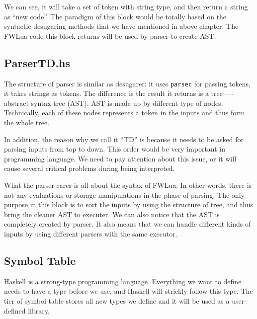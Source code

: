 \documentclass{article}
\begin{document}
We can see, it will take a set of token with string type, and then return a string as ``new code''. The paradigm of this block would be totally based on the syntactic desugaring methods that we have mentioned in above chapter. The FWLua code this block returns will be used by parser to create AST.

\subsection{ParserTD.hs}
The structure of parser is similar as desugarer: it uses {\tt parsec} for passing tokens, it takes strings as tokens. The difference is the result it returns is a tree ---- abstract syntax tree (AST).
AST is made up by different type of nodes. Technically, each of these nodes represents a token in the inputs and thus form the whole tree.

In addition, the reason why we call it ``TD'' is because it needs to be asked for parsing inputs from top to down. This order would be very important in programming language. We need to pay attention about this issue, or it will cause several critical problems during being interpreted.

What the parser cares is all about the syntax of FWLua. In other words, there is not any evaluations or storage manipulations in the phase of parsing. The only purpose in this block is to sort the inputs by using the structure of tree, and thus bring the cleaner AST to executer. We can also notice that the AST is completely created by parser. It also means that we can handle different kinds of inputs by using different parsers with the same executor.

\subsection{Symbol Table}
Haskell is a strong-type programming language. Everything we want to define needs to have a type before we use, and Haskell will strickly follow this type. The tier of symbol table stores all new types we define and it will be used as a user-defined library.
\end{document}
